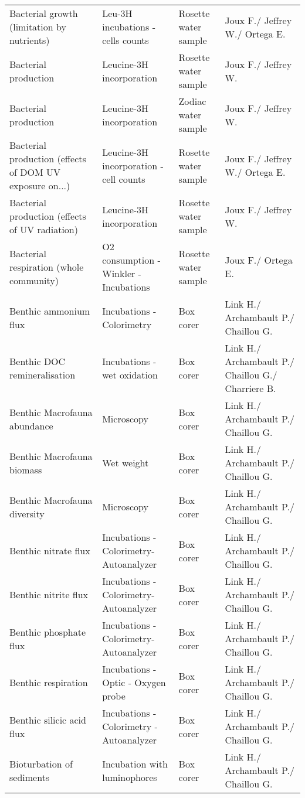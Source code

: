 \begin{landscape}
\begin{longtable}[t]{llll}
Bacterial growth (limitation by nutrients) & Leu-3H incubations - cells counts & Rosette water sample & Joux F./ Jeffrey W./ Ortega E.\\
\addlinespace
Bacterial production & Leucine-3H incorporation & Rosette water sample & Joux F./ Jeffrey W.\\
Bacterial production & Leucine-3H incorporation & Zodiac water sample & Joux F./ Jeffrey W.\\
Bacterial production (effects of DOM UV exposure on...) & Leucine-3H incorporation - cell counts & Rosette water sample & Joux F./ Jeffrey W./ Ortega E.\\
Bacterial production (effects of UV radiation) & Leucine-3H incorporation & Rosette water sample & Joux F./ Jeffrey W.\\
Bacterial respiration (whole community) & O2 consumption - Winkler - Incubations & Rosette water sample & Joux F./ Ortega E.\\
\addlinespace
Benthic ammonium flux & Incubations - Colorimetry & Box corer & Link H./ Archambault P./ Chaillou G.\\
Benthic DOC remineralisation & Incubations - wet oxidation & Box corer & Link H./ Archambault P./ Chaillou G./ Charriere B.\\
Benthic Macrofauna abundance & Microscopy & Box corer & Link H./ Archambault P./ Chaillou G.\\
Benthic Macrofauna biomass & Wet weight & Box corer & Link H./ Archambault P./ Chaillou G.\\
Benthic Macrofauna diversity & Microscopy & Box corer & Link H./ Archambault P./ Chaillou G.\\
\addlinespace
Benthic nitrate flux & Incubations - Colorimetry- Autoanalyzer & Box corer & Link H./ Archambault P./ Chaillou G.\\
Benthic nitrite flux & Incubations - Colorimetry- Autoanalyzer & Box corer & Link H./ Archambault P./ Chaillou G.\\
Benthic phosphate flux & Incubations - Colorimetry- Autoanalyzer & Box corer & Link H./ Archambault P./ Chaillou G.\\
Benthic respiration & Incubations - Optic - Oxygen probe & Box corer & Link H./ Archambault P./ Chaillou G.\\
Benthic silicic acid flux & Incubations - Colorimetry - Autoanalyzer & Box corer & Link H./ Archambault P./ Chaillou G.\\
\addlinespace
Bioturbation of sediments & Incubation with luminophores & Box corer & Link H./ Archambault P./ Chaillou G.\\

\end{longtable}
\end{landscape}
